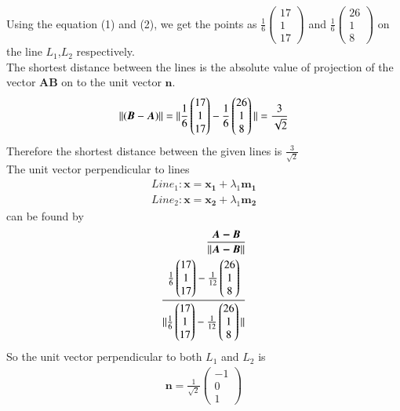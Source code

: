 \documentclass[journal,12pt,twocolumn]{IEEEtran}
\newcommand{\norm}[1]{\| #1 \|}
\begin{document}
Using the equation (1) and (2), we get the points as $\frac{1}{6}\begin{pmatrix}17\\1\\17\end{pmatrix}$ and $\frac{1}{6}\begin{pmatrix}26\\1\\8\end{pmatrix}$ on the line $L_1$,$L_2$ respectively.\\
\vspace{5mm}
The shortest distance between the lines is the absolute value of projection of the vector $\bm{AB}$ on to the unit vector $\bm{n}$.
\begin{equation}
    \norm{(\bm{B}-\bm{A})}\\
    =\norm{\frac{1}{{6}}\begin{pmatrix}17\\1\\17\end{pmatrix}-\frac{1}{{6}}\begin{pmatrix}26\\1\\8\end{pmatrix}}\\
    =\frac{3}{\sqrt{2}}
\end{equation}
Therefore the shortest distance between the given lines is $\frac{3}{\sqrt{2}}$\\
The unit vector perpendicular to lines \\
\begin{align}
    Line_1\colon \bm{x}=\bm{x_1}+\lambda_1\bm{m_1}\\
    Line_2\colon \bm{x}=\bm{x_2}+\lambda_1\bm{m_2}
\end{align}
can be found by 
\begin{align}
    \frac{\bm{A-B}}{\norm{\bm{A-B}}}\\
    \frac{\frac{1}{{6}}\begin{pmatrix}17\\1\\17\end{pmatrix}-\frac{1}{{12}}\begin{pmatrix}26\\1\\8\end{pmatrix}}{\norm{\frac{1}{{6}}\begin{pmatrix}17\\1\\17\end{pmatrix}-\frac{1}{{12}}\begin{pmatrix}26\\1\\8\end{pmatrix}}}\notag
\end{align}
So the unit vector perpendicular to both $L_1$ and $L_2$ is
\begin{align}
    \bm{n}=\frac{1}{\sqrt{2}}\begin{pmatrix}-1\\0\\1\end{pmatrix}
\end{align}
\end{document}
